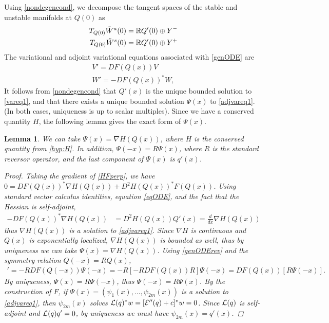 \documentclass[10pt,reqno]{amsart}
\theoremstyle{plain}
\newtheorem{lemma}[theorem]{Lemma}
\theoremstyle{definition}
\theoremstyle{remark}
\numberwithin{theorem}{section}
\numberwithin{equation}{section}
\begin{document}
Using \cref{nondegencond}, we decompose the tangent spaces of the stable and unstable manifolds at $Q(0)$ as 
\begin{equation*}
\begin{aligned}
T_{Q(0)}\tilde{W}^u(0) &= \mathbb{R} Q'(0) \oplus Y^- \\
T_{Q(0)}\tilde{W}^s(0) &= \mathbb{R} Q'(0) \oplus Y^+
\end{aligned}
\end{equation*}
The variational and adjoint variational equations associated with \cref{genODE} are
\begin{align}
V' = DF(Q(x)) V \label{vareq1} \\
W' = -DF(Q(x))^* W \label{adjvareq1},
\end{align}
It follows from \cref{nondegencond} that $Q'(x)$ is the unique bounded solution to \cref{vareq1}, and that there exists a unique bounded solution $\Psi(x)$ to \cref{adjvareq1}. (In both cases, uniqueness is up to scalar multiples). Since we have a conserved quantity $H$, the following lemma gives the exact form of $\Psi(x)$.

\begin{lemma}\label{psiform}
We can take $\Psi(x) = \nabla H(Q(x))$, where $H$ is the conserved quantity from \cref{hyp:H}. In addition, $\Psi(-x) = R \Psi(x)$, where $R$ is the standard reversor operator, and the last component of $\Psi(x)$ is $q'(x)$.
\begin{proof}
Taking the gradient of \cref{HFperp}, we have $0 = D F(Q(x))^* \nabla H(Q(x)) + D^2 H(Q(x))^* F(Q(x))$. Using standard vector calculus identities, equation \cref{eqODE}, and the fact that the Hessian is self-adjoint,
\begin{align*}
-D F(Q(x))^* \nabla H(Q(x)) &= D^2 H(Q(x)) Q'(x) = \frac{d}{dx} \nabla H(Q(x))
\end{align*}
thus $\nabla H(Q(x))$ is a solution to \eqref{adjvareq1}. Since $\nabla H$ is continuous and $Q(x)$ is exponentially localized, $\nabla H(Q(x))$ is bounded as well, thus by uniqueness we can take $\Psi(x) = \nabla H(Q(x))$. Using \eqref{genODErev} and the symmetry relation $Q(-x) = R Q(x)$, 
\begin{align*}
[R \Psi(-x)]' = -R DF(Q(-x)) \Psi(-x) 
= -R [-RDF(Q(x))R] \Psi(-x) = DF(Q(x))[ R \Psi(-x) ].
\end{align*}
By uniqueness, $\Psi(x) = R \Psi(-x)$, thus $\Psi(-x) = R \Psi(x)$. By the construction of $F$, if $\Psi(x) = (\psi_1(x), \dots, \psi_{2m}(x))$ is a solution to \cref{adjvareq1}, then $\psi_{2m}(x)$ solves $\mathcal{L}(q)^* w = [\mathcal{E}''(q) + c]^* w = 0$. Since $\mathcal{L}(q)$ is self-adjoint and $\mathcal{L}(q)q' = 0$, by uniqueness we must have $\psi_{2m}(x) = q'(x)$.
\end{proof}
\end{lemma}
\end{document}
